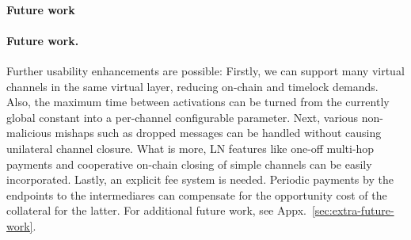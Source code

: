\makeatletter%
%
  {\paragraph{Future work}}%
  {\paragraph{Future work.}}%
\makeatother%
Further usability enhancements are possible: Firstly, we can support many
virtual channels in the same virtual layer, reducing on-chain and timelock
demands. Also, the maximum time between activations can be turned from the
currently global constant into a per-channel configurable parameter. Next,
various non-malicious mishaps such as dropped messages can be handled without
causing unilateral channel closure. What is more, LN features like one-off
multi-hop payments and cooperative on-chain closing of simple channels can be
easily incorporated. Lastly, an explicit fee system is needed. Periodic payments
by the endpoints to the intermediares can compensate for the opportunity cost of
the collateral for the latter. For additional future work, see
Appx.~\ref{sec:extra-future-work}.
